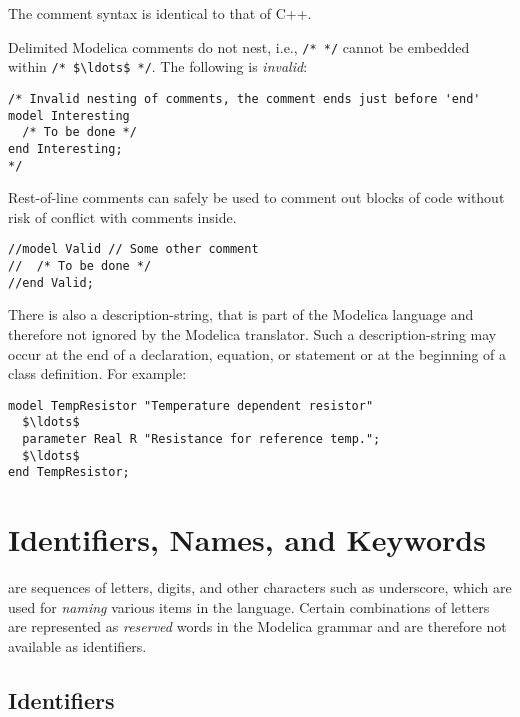 \begin{nonnormative}
The comment syntax is identical to that of C++.
\end{nonnormative}

Delimited Modelica comments do not nest, i.e., \lstinline!/* */! cannot be embedded within \lstinline!/* $\ldots$ */!.
The following is \emph{invalid}:
\begin{lstlisting}[language=modelica]
/* Invalid nesting of comments, the comment ends just before 'end'
model Interesting
  /* To be done */
end Interesting;
*/
\end{lstlisting}
Rest-of-line comments can safely be used to comment out blocks of code without risk of conflict with comments inside.
\begin{lstlisting}[language=modelica]
//model Valid // Some other comment
//  /* To be done */
//end Valid;
\end{lstlisting}

There is also a description-string, that is part of the Modelica language and
therefore not ignored by the Modelica translator. Such a description-string may
occur at the end of a declaration, equation, or statement or at the
beginning of a class definition. For example:
\begin{lstlisting}[language=modelica]
model TempResistor "Temperature dependent resistor"
  $\ldots$
  parameter Real R "Resistance for reference temp.";
  $\ldots$
end TempResistor;
\end{lstlisting}

\section{Identifiers, Names, and Keywords}\label{identifiers-names-and-keywords}

 are sequences of letters, digits, and other characters such as underscore, which are used for \emph{naming} various items in the language.
Certain combinations of letters are  represented as \emph{reserved} words in the Modelica grammar and are therefore not available as identifiers.

\subsection{Identifiers}\label{identifiers}

